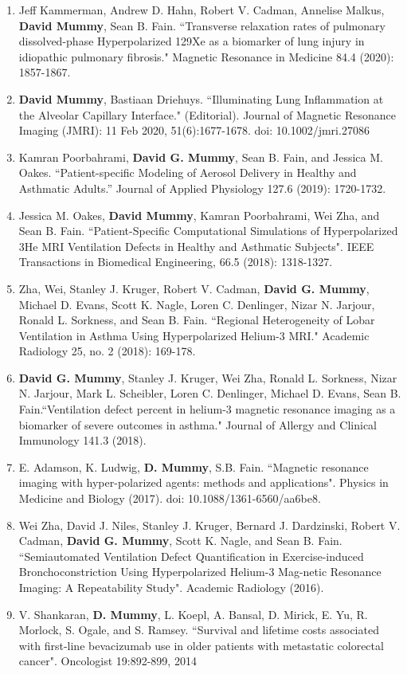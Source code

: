 \documentclass[10pt]{article}
\begin{document}
\begin{enumerate}
\item Jeff Kammerman, Andrew D. Hahn, Robert V. Cadman, Annelise Malkus, {\bf David Mummy}, Sean B. Fain. ``Transverse relaxation rates of pulmonary dissolved-phase Hyperpolarized 129Xe as a biomarker of lung injury in idiopathic pulmonary fibrosis." Magnetic Resonance in Medicine 84.4 (2020): 1857-1867.
\item {\bf David Mummy}, Bastiaan Driehuys. ``Illuminating Lung Inflammation at the Alveolar Capillary Interface." (Editorial). Journal of Magnetic Resonance Imaging (JMRI): 11 Feb 2020, 51(6):1677-1678. doi: 10.1002/jmri.27086 
\item Kamran Poorbahrami, {\bf David G. Mummy}, Sean B. Fain, and Jessica M. Oakes. “Patient-specific Modeling of Aerosol Delivery in Healthy and Asthmatic Adults.” Journal of Applied Physiology 127.6 (2019): 1720-1732.
\item Jessica M. Oakes, {\bf David Mummy}, Kamran Poorbahrami, Wei Zha, and Sean B. Fain. ``Patient-Specific Computational Simulations of Hyperpolarized 3He MRI Ventilation Defects in Healthy and Asthmatic Subjects". IEEE Transactions in Biomedical Engineering, 66.5 (2018): 1318-1327.
\item Zha, Wei, Stanley J. Kruger, Robert V. Cadman, {\bf David G. Mummy}, Michael D. Evans, Scott K. Nagle, Loren C. Denlinger, Nizar N. Jarjour, Ronald L. Sorkness, and Sean B. Fain. ``Regional Heterogeneity of Lobar Ventilation in Asthma Using Hyperpolarized Helium-3 MRI." Academic Radiology 25, no. 2 (2018): 169-178.
\item {\bf David G. Mummy}, Stanley J. Kruger, Wei Zha, Ronald L. Sorkness, Nizar N. Jarjour, Mark L. Scheibler, Loren C. Denlinger, Michael D. Evans, Sean B. Fain.``Ventilation defect percent in helium-3 magnetic resonance imaging as a biomarker of severe outcomes in asthma." Journal of Allergy and Clinical Immunology 141.3 (2018). 
\item E. Adamson, K. Ludwig, {\bf D. Mummy}, S.B. Fain. ``Magnetic resonance imaging with hyper-polarized agents: methods and applications". Physics in Medicine and Biology (2017). doi: 10.1088/1361-6560/aa6be8.
    \item Wei Zha, David J. Niles, Stanley J. Kruger, Bernard J. Dardzinski, Robert V. Cadman, {\bf David G. Mummy}, Scott K. Nagle, and Sean B. Fain. ``Semiautomated Ventilation Defect Quantification in Exercise-induced Bronchoconstriction Using Hyperpolarized Helium-3 Mag-netic Resonance Imaging: A Repeatability Study". Academic Radiology (2016).
    \item V. Shankaran, {\bf D. Mummy}, L. Koepl, A. Bansal, D. Mirick, E. Yu, R. Morlock, S. Ogale, and S. Ramsey. ``Survival and lifetime costs associated with first-line bevacizumab use in older patients with metastatic colorectal cancer". Oncologist 19:892-899, 2014

\end{enumerate}
\end{document}
